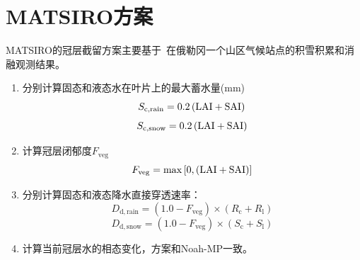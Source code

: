\section{MATSIRO方案}
MATSIRO的冠层截留方案主要基于~\cite{storck2002measurement}在俄勒冈一个山区气候站点的积雪积累和消融观测结果。
\begin{enumerate}
  \item 分别计算固态和液态水在叶片上的最大蓄水量(mm)\\
    \begin{equation}
      S_{\mathrm{c,rain}}=0.2\left({\rm LAI}+{\rm SAI}\right)
    \end{equation}
    \begin{equation}
      S_{\mathrm{c,snow}}=0.2\left({\rm LAI}+{\rm SAI}\right)
    \end{equation}

  \item 计算冠层闭郁度$F_{\mathrm{veg}}$
    \begin{equation}
      F_{\mathrm{veg}} = \max\left[0, \left({\rm LAI}+{\rm SAI}\right)\right]
    \end{equation}

  \item 分别计算固态和液态降水直接穿透速率：
    \begin{equation}
      D_{\mathrm{d,rain}}=\left(1.0-F_{\mathrm{veg}}\right) \times (R_{\mathrm{c}}+R_{\mathrm{l}})
    \end{equation}
    \begin{equation}
      D_{\mathrm{d,snow}}=\left(1.0-F_{\mathrm{veg}}\right) \times (S_{\mathrm{c}}+S_{\mathrm{l}})
    \end{equation}
  \item 计算当前冠层水的相态变化，方案和Noah-MP一致。


\end{enumerate}
